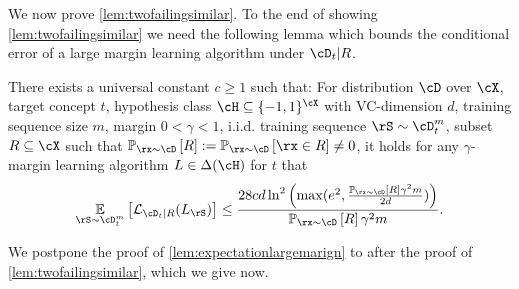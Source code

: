We now prove \cref{lem:twofailingsimilar}. To the end of showing \cref{lem:twofailingsimilar} we need the following lemma which bounds the conditional error of a large margin learning algorithm under $ \cD_{t}|R $.

\begin{lemma}\label{lem:expectationlargemarign}
    There exists a universal constant $ c\geq1 $ such that: For distribution $ \cD $ over $ \cX $, target concept $ t $,  hypothesis class $ \cH \subseteq \{-1,1  \}^{\cX} $ with VC-dimension $ d $,  training sequence size $ m $, margin $ 0<\gamma<1 $, i.i.d. training sequence $ \rS\sim \cD_{t}^{m} $, subset $ R\subseteq \cX $ such that $ \p_{\rx\sim \cD}\left[R\right]:=\p_{\rx\sim\cD}\left[\rx\in R\right]\not=0 $, it holds for any $ \gamma $-margin learning algorithm $ L\in \dlh $ for $ t $  that  
    \begin{align*}
        \e_{\rS\sim \cD_{t}^{m}}\left[\ls_{\cD_{t}|R}(L_{\rS})\right] \leq\frac{28cd\ln^{2}{\left( \max(e^{2},\frac{\p_{\rx\sim \cD}\left[R\right]\gamma^{2}m}{2d})\right)}}{\p_{\rx\sim \cD}\left[R\right]\gamma^{2}m}.
    \end{align*}
\end{lemma}

We postpone the proof of \cref{lem:expectationlargemarign} to after the proof of \cref{lem:twofailingsimilar}, which we give now. 

